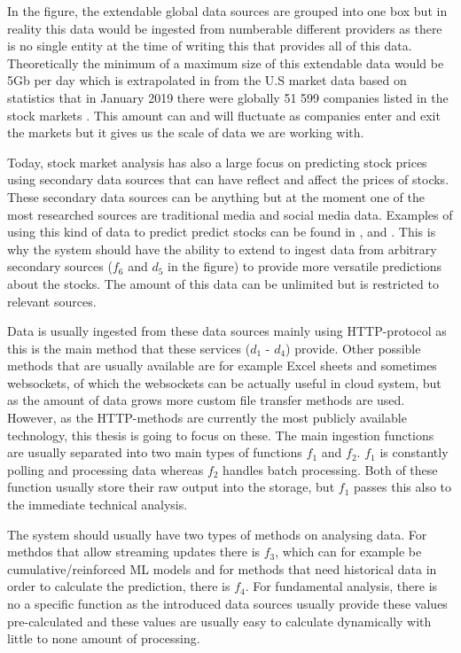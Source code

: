 In the figure, the extendable global data sources are grouped into one box but in reality this data would be ingested from numberable different providers as there is no single entity at the time of writing this that provides all of this data.
Theoretically the minimum of a maximum size of this extendable data would be 5Gb per day which is extrapolated in from the U.S market data based on statistics that in January 2019 there were globally 51 599 companies listed in the stock markets \cite{global}.
This amount can and will fluctuate as companies enter and exit the markets but it gives us the scale of data we are working with.

Today, stock market analysis has also a large focus on predicting stock prices using secondary data sources that can have reflect and affect the prices of stocks. 
These secondary data sources can be anything but at the moment one of the most researched sources are traditional media and social media data.
Examples of using this kind of data to predict predict stocks can be found in \cite{kao}, \cite{skuza} and \cite{wai}.
This is why the system should have the ability to extend to ingest data from arbitrary secondary sources ($f_6$ and $d_5$ in the figure) to provide more versatile predictions about the stocks.
The amount of this data can be unlimited but is restricted to relevant sources.

Data is usually ingested from these data sources mainly using HTTP-protocol as this is the main method that these services ($d_1$ - $d_4$) provide.
Other possible methods that are usually available are for example Excel sheets and sometimes websockets, of which the websockets can be actually useful in cloud system, but as the amount of data grows more custom file transfer methods are used.
However, as the HTTP-methods are currently the most publicly available technology, this thesis is going to focus on these.
The main ingestion functions are usually separated into two main types of functions $f_1$ and $f_2$. 
$f_1$ is constantly polling and processing data whereas $f_2$ handles batch processing.
Both of these function usually store their raw output into the storage, but $f_1$ passes this also to the immediate technical analysis.

The system should usually have two types of methods on analysing data.
For methdos that allow streaming updates there is $f_3$, which can for example be cumulative/reinforced ML models and for methods that need historical data in order to calculate the prediction, there is $f_4$.
For fundamental analysis, there is no a specific function as the introduced data sources usually provide these values pre-calculated and these values are usually easy to calculate dynamically with little to none amount of processing.

